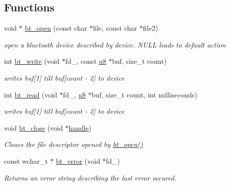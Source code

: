 \subsection*{Functions}
\begin{DoxyCompactItemize}
\item 
void $\ast$ \hyperlink{bt-unix_8c_a604b81ec74c835b44c026a6af353e8d6}{bt\+\_\+open} (const char $\ast$file, const char $\ast$file2)
\begin{DoxyCompactList}\small\item\em open a bluetooth device described by device. {\ttfamily N\+U\+L\+L} leads to default action \end{DoxyCompactList}\item 
int \hyperlink{bt-unix_8c_acbb62c11a110c097a4a9be010af9c4e7}{bt\+\_\+write} (void $\ast$fd\+\_\+, const \hyperlink{defs_8h_a92c50087ca0e64fa93fc59402c55f8ca}{u8} $\ast$buf, size\+\_\+t count)
\begin{DoxyCompactList}\small\item\em writes buf\mbox{[}1\mbox{]} till buf\mbox{[}count -\/ 2\mbox{]} to device \end{DoxyCompactList}\item 
int \hyperlink{bt-unix_8c_a0100d3e3520a9b774896f6b2a2f589f5}{bt\+\_\+read} (void $\ast$fd\+\_\+, \hyperlink{defs_8h_a92c50087ca0e64fa93fc59402c55f8ca}{u8} $\ast$buf, size\+\_\+t count, int milliseconds)
\begin{DoxyCompactList}\small\item\em writes buf\mbox{[}1\mbox{]} till buf\mbox{[}count -\/ 2\mbox{]} to device \end{DoxyCompactList}\item 
void \hyperlink{bt-unix_8c_a66111b994dc31a22f27679a286c338e4}{bt\+\_\+close} (void $\ast$\hyperlink{ev3__io_8h_aa0fee4a3e0cbfef079dcc441aaf8a8bf}{handle})
\begin{DoxyCompactList}\small\item\em Closes the file descriptor opened by \hyperlink{bt-unix_8c_a604b81ec74c835b44c026a6af353e8d6}{bt\+\_\+open()} \end{DoxyCompactList}\item 
const wchar\+\_\+t $\ast$ \hyperlink{bt-unix_8c_a91cd0489b6e5dc0973109579ca9c7a55}{bt\+\_\+error} (void $\ast$fd\+\_\+)
\begin{DoxyCompactList}\small\item\em Returns an error string describing the last error occured. \end{DoxyCompactList}\end{DoxyCompactItemize}


